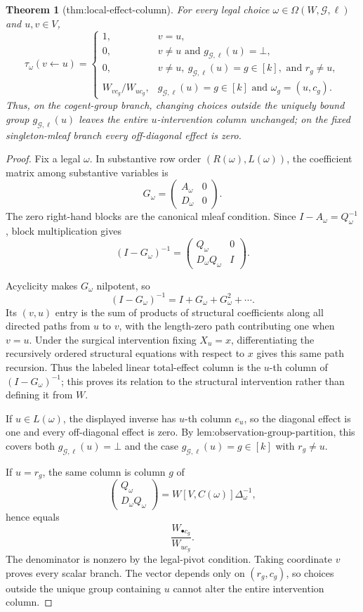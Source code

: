 \documentclass{article}
\newtheorem{theorem}{Theorem}
\begin{document}
\begin{theorem}[thm:local-effect-column]\label{thm:local-effect-column}
For every legal choice \(\omega\in\Omega(W,\mathcal G,\ell)\) and \(u,v\in V\), \[\tau_{\omega}(v\leftarrow u)=\begin{cases}1,&v=u,\\0,&v\ne u\text{ and }g_{\mathcal G,\ell}(u)=\bot,\\0,&v\ne u,\ g_{\mathcal G,\ell}(u)=g\in[k],\text{ and }r_g\ne u,\\W_{v c_g}/W_{u c_g},&g_{\mathcal G,\ell}(u)=g\in[k]\text{ and }\omega_g=(u,c_g).\end{cases}\] Thus, on the cogent-group branch, changing choices outside the uniquely bound group \(g_{\mathcal G,\ell}(u)\) leaves the entire \(u\)-intervention column unchanged; on the fixed singleton-mleaf branch every off-diagonal effect is zero.
\end{theorem}
\begin{proof}
Fix a legal \(\omega\). In substantive row order \((R(\omega),L(\omega))\), the coefficient matrix among substantive variables is
\[
G_\omega=\begin{pmatrix}A_\omega&0\\D_\omega&0\end{pmatrix}.
\]
The zero right-hand blocks are the canonical mleaf condition. Since \(I-A_\omega=Q_\omega^{-1}\), block multiplication gives
\[
(I-G_\omega)^{-1}=\begin{pmatrix}Q_\omega&0\\D_\omega Q_\omega&I\end{pmatrix}.
\]

Acyclicity makes \(G_\omega\) nilpotent, so
\[
(I-G_\omega)^{-1}=I+G_\omega+G_\omega^2+\cdots.
\]
Its \((v,u)\) entry is the sum of products of structural coefficients along all directed paths from \(u\) to \(v\), with the length-zero path contributing one when \(v=u\). Under the surgical intervention fixing \(X_u=x\), differentiating the recursively ordered structural equations with respect to \(x\) gives this same path recursion. Thus the labeled linear total-effect column is the \(u\)-th column of \((I-G_\omega)^{-1}\); this proves its relation to the structural intervention rather than defining it from \(W\).

If \(u\in L(\omega)\), the displayed inverse has \(u\)-th column \(e_u\), so the diagonal effect is one and every off-diagonal effect is zero. By \(\text{lem:observation-group-partition}\), this covers both \(g_{\mathcal G,\ell}(u)=\bot\) and the case \(g_{\mathcal G,\ell}(u)=g\in[k]\) with \(r_g\ne u\).

If \(u=r_g\), the same column is column \(g\) of
\[
\begin{pmatrix}Q_\omega\\D_\omega Q_\omega\end{pmatrix}
=W[V,C(\omega)]\Delta_\omega^{-1},
\]
hence equals
\[
\frac{W_{\bullet c_g}}{W_{uc_g}}.
\]
The denominator is nonzero by the legal-pivot condition. Taking coordinate \(v\) proves every scalar branch. The vector depends only on \((r_g,c_g)\), so choices outside the unique group containing \(u\) cannot alter the entire intervention column.
\end{proof}
\end{document}
